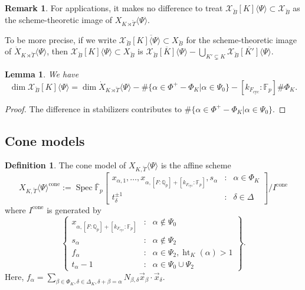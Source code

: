 \documentclass[11pt]{amsart}
\newcommand{\MINOREDITED}[1]{#1}
\newtheorem{lem}[thm]{Lemma}
\theoremstyle{definition}
\newtheorem{defn}[thm]{Definition}
\newtheorem{remark}[thm]{Remark}
\newcommand{\Q}{\mathbb{Q}}
\newcommand{\F}{\mathbb{F}}
\newcommand{\bFp}{\bar{\mathbb{F}}_p}
\newcommand{\cX}{\mathcal{X}}
\newcommand{\bB}{\breve{B}}
\newcommand{\bT}{\breve{T}}
\newcommand{\cone}{{\operatorname{cone}}}
\newcommand{\cyc}{{\operatorname{cyc}}}
\newcommand{\dkF}{[k_{F_{\cyc}}:\F_p]}
\newcommand{\dF}{[F:\Q_p]}
\DeclareMathOperator{\Ht}{ht}
\DeclareMathOperator{\Spec}{Spec}
\begin{document}
\begin{remark}
\label{rem:sq-K}
For applications,
it makes no difference to treat
$\cX_{\bB}[K]\langle\Psi\rangle\subset \cX_{\bB}$
as the scheme-theoretic image of
$X_{K\rtimes \bT}\langle\Psi\rangle$.

To be more precise,
if we write $\overline{\cX_{\bB}[K]\langle\Psi\rangle\subset X_{\bB}}$
for the scheme-theoretic image
of $\dot X_{K\rtimes \bT}\langle\Psi\rangle$,
then
$\cX_{\bB}[K]\langle\Psi\rangle\subset X_{\bB}$
is $\overline{\cX_{\bB}[K]\langle\Psi\rangle}
- \bigcup_{K'\subsetneq K}\overline{\cX_{\bB}[K']\langle\Psi\rangle}$.
\end{remark}

\begin{lem}
We have
\[
\dim \cX_{\bB}[K]\langle\Psi\rangle
=
\dim \dot X_{K\rtimes \bT}\langle\Psi\rangle
-\#\{\alpha\in \Phi^+-\Phi_K|\alpha\in \Psi_0\}
-\dkF\#\Phi_K.
\]
\end{lem}

\begin{proof}
The difference in stabilizers contributes
to $\#\{\alpha\in \Phi^+-\Phi_K|\alpha\in \Psi_0\}$.
\end{proof}

\subsection{Cone models}

\begin{defn}
The cone model of $X_{K,\bT}\langle\Psi\rangle$
is the affine scheme 
\[
X_{K,\bT}\langle\Psi\rangle^\cone:=
\Spec \bFp
\left[
\begin{matrix}
x_{\alpha,1},\dots,x_{\alpha,\dF+\dkF},
s_\alpha&:&\alpha\in \Phi_K
\\
t_\delta^{\pm 1}&:&
\delta\in \Delta
\end{matrix}
\right]/
I^\cone
\]
where
$I^\cone$ is generated by
\[
\left\{
\begin{matrix}
x_{\alpha,\dF+\dkF} &:& \alpha\not\in\Psi_0 \\
s_\alpha &:& \alpha \not\in \Psi_2 \\
f_\alpha &:& \alpha \in \Psi_2, \Ht_K(\alpha)>1 \\
t_\alpha-1 &:& \alpha\in \Psi_0\cup\Psi_2
\end{matrix}
\right\}.
\]
Here, $f_\alpha=\sum_{\beta\in \Phi_K,
\delta\in \Delta_K, \delta+\beta=\alpha}
N_{\beta, \MINOREDITED{\delta}}\vec x_\beta\cdot
\vec x_{\MINOREDITED{\delta}}$.
\end{defn}
\end{document}
